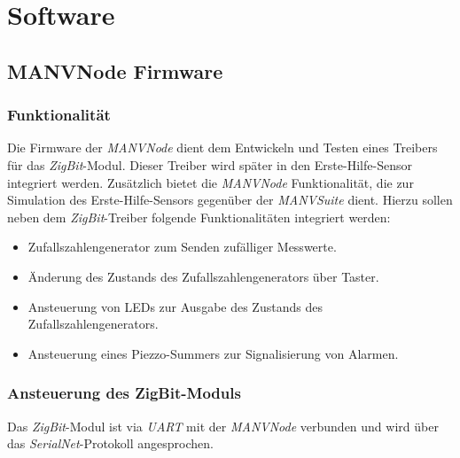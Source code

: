 \section{Software}
\subsection{MANVNode Firmware}

\subsubsection{Funktionalität}
Die Firmware der \emph{MANVNode} dient dem Entwickeln und Testen eines Treibers für das \emph{ZigBit}-Modul. Dieser
Treiber wird später in den Erste-Hilfe-Sensor integriert werden. Zusätzlich bietet die \emph{MANVNode} Funktionalität,
die zur Simulation des Erste-Hilfe-Sensors gegenüber der \emph{MANVSuite} dient. Hierzu sollen neben dem 
\emph{ZigBit}-Treiber folgende Funktionalitäten integriert werden:

\begin{itemize}
    \item Zufallszahlengenerator zum Senden zufälliger Messwerte.
    \item Änderung des Zustands des Zufallszahlengenerators über Taster.
    \item Ansteuerung von LEDs zur Ausgabe des Zustands des Zufallszahlengenerators.
    \item Ansteuerung eines Piezzo-Summers zur Signalisierung von Alarmen.
\end{itemize}


\subsubsection{Ansteuerung des ZigBit-Moduls}
Das \emph{ZigBit}-Modul ist via \emph{UART} mit der \emph{MANVNode} verbunden und wird über das \emph{SerialNet}-Protokoll
angesprochen.

